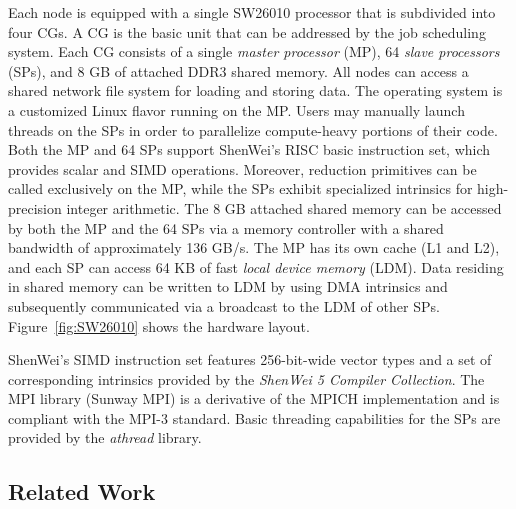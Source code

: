 Each node is equipped with a single SW26010 processor that is
subdivided into four CGs. A CG is the basic
unit that can be addressed by the job scheduling system. Each CG
consists of a single {\em master processor} (MP), 64 {\em slave
  processors} (SPs), and 8 GB of attached DDR3 shared memory. All
nodes can access a shared network file system for loading and storing
data. The operating system is a customized Linux flavor running on the
MP.  Users may manually launch threads on the SPs in order to
parallelize compute-heavy portions of their code. Both the MP and 64
SPs support ShenWei's RISC basic instruction set, which provides
scalar and SIMD operations. Moreover, reduction primitives can be
called exclusively on the MP, while the SPs exhibit specialized
intrinsics for high-precision integer arithmetic. The 8 GB attached
shared memory can be accessed by both the MP and the 64 SPs via a
memory controller with a shared bandwidth of approximately 136
GB/s. The MP has its own cache (L1 and L2), and each SP can access 64
KB of fast {\em local device memory} (LDM). Data residing in shared
memory can be written to LDM by using DMA intrinsics and subsequently
communicated via a broadcast to the LDM of other
SPs. Figure~\ref{fig:SW26010} shows the hardware layout.

ShenWei's SIMD instruction set features 256-bit-wide vector types and
a set of corresponding intrinsics provided by the \emph{ShenWei 5
  Compiler Collection}.  The MPI library (Sunway MPI) is a derivative
of the MPICH implementation and is compliant with the MPI-3 standard.
Basic threading capabilities for the SPs are provided by the
\emph{athread} library.

\subsection{Related Work}

